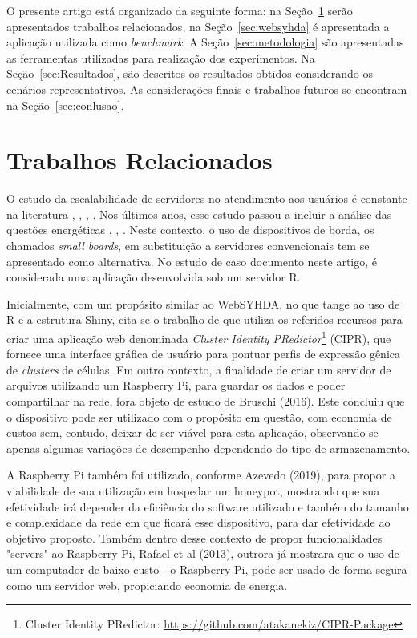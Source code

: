 \documentclass[12pt,english,brazil]{article}
\begin{document}
O presente artigo está organizado da seguinte forma: na Seção~\ref{sec:TrabalhosRelacionados} serão apresentados trabalhos relacionados, na Seção~\ref{sec:websyhda} é apresentada a aplicação utilizada como \emph{benchmark}. A Seção~\ref{sec:metodologia} são apresentadas as ferramentas utilizadas para realização dos experimentos. Na Seção~\ref{sec:Resultados}, são descritos os resultados obtidos considerando os cenários representativos. As considerações finais e trabalhos futuros se encontram na Seção~\ref{sec:conlusao}.

\section{Trabalhos Relacionados} \label{sec:TrabalhosRelacionados}

O estudo da escalabilidade de servidores no atendimento aos usuários é constante na literatura \cite{generic1}, \cite{generic5}, \cite{generic3}, \cite{generic4}. Nos últimos anos, esse estudo passou a incluir a análise das questões
energéticas \cite{generic6}, \cite{generic7}, \cite{generic8}. Neste contexto, o uso de dispositivos de borda, os chamados \emph{small
boards}, em substituição a servidores convencionais tem se apresentado como alternativa. No estudo de caso documento neste artigo, é considerada uma aplicação desenvolvida sob um servidor R.

Inicialmente, com um propósito similar ao WebSYHDA, no que tange ao uso de R e a estrutura Shiny, cita-se o  trabalho de \cite{CIPR} que utiliza os referidos recursos para criar uma aplicação web denominada \emph{Cluster Identity PRedictor}\footnote{Cluster Identity PRedictor: \url{https://github.com/atakanekiz/CIPR-Package}} (CIPR), que fornece uma interface gráfica de usuário para pontuar perfis de expressão gênica de \emph{clusters} de células.
Em outro contexto, a finalidade de criar um servidor de arquivos utilizando um Raspberry Pi, para guardar os dados e poder compartilhar na rede, fora objeto de estudo de Bruschi (2016). Este concluiu que o dispositivo pode ser utilizado com o propósito em questão, com economia de custos sem, contudo, deixar de ser viável para esta aplicação, observando-se apenas algumas variações de desempenho dependendo do tipo de armazenamento.

A Raspberry Pi também foi utilizado, conforme Azevedo (2019), para propor a viabilidade de sua utilização em hospedar um honeypot, mostrando que sua efetividade irá depender da eficiência do software utilizado e também do tamanho e complexidade da rede em que ficará esse dispositivo, para dar efetividade ao objetivo proposto. Também dentro desse contexto de propor funcionalidades "servers" ao Raspberry Pi, Rafael et al (2013), outrora já mostrara que o uso de um computador de baixo custo - o Raspberry-Pi, pode ser usado de forma segura como um servidor web,  propiciando economia de energia.
\end{document}
